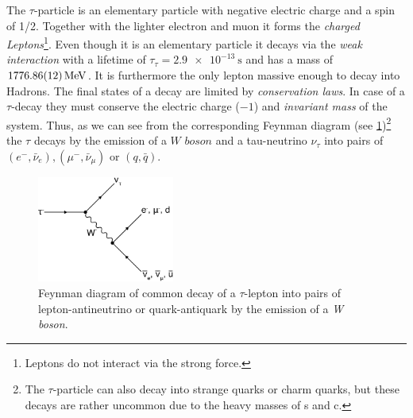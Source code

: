 \documentclass[../../index.tex]{subfiles}
\begin{document}
The $\tau$-particle is an elementary particle with negative electric charge and
a spin of 1/2. Together with the lighter electron and muon it forms the
\textit{charged Leptons}\footnote{Leptons do not interact via the strong
  force.}. Even though it is an elementary particle it decays via the
\textit{weak interaction} with a lifetime of $\tau_\tau=\SI{2.9e-13}{\second}$
and has a mass of $\SI{1776.86\pm0.12}{\mega\electronvolt}$\cite{PDG2018}. It is
furthermore the only lepton massive enough to decay into Hadrons. The final
states of a decay are limited by \textit{conservation laws}. In case of a
$\tau$-decay they must conserve the electric charge ($-1$) and \textit{invariant
  mass} of the system. Thus, as we can see from the corresponding Feynman
diagram (see \cref{fig:tauDecay})\footnote{The $\tau$-particle can also decay
  into strange quarks or charm quarks, but these decays are rather uncommon due
  to the heavy masses of s and c.} the $\tau$ decays by the emission of a
$\textit{W boson}$ and a tau-neutrino $\nu_\tau$ into pairs of $(e^-,
\bar\nu_e), (\mu^-, \bar\nu_\mu)$ or $(q, \bar q)$.
\begin{figure}[h]
  \centering \includegraphics[width=0.4\textwidth]{images/tauDecay.eps}
  \caption{Feynman diagram of common decay of a $\tau$-lepton into pairs of
    lepton-antineutrino or quark-antiquark by the emission of a \textit{W
      boson}.}
  \label{fig:tauDecay}
\end{figure}
\end{document}
